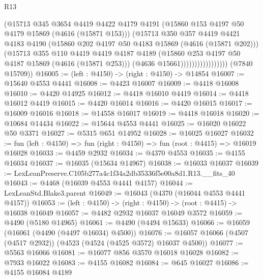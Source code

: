 \begin{lexlean}{R13}
\begin{coremodule}
                                (@15713
                                  @345
                                  @3654
                                  @4419
                                  @4422
                                  @4179
                                  @4191
                                  (@15860 @153 @4197 @50 @4179 @15869 (@4616 (@15871 @153)))
                                  (@15713
                                    @350
                                    @357
                                    @4419
                                    @4421
                                    @4183
                                    @4190
                                    (@15860 @202 @4197 @50 @4183 @15869 (@4616 (@15871 @202)))
                                    (@15713
                                      @355
                                      @110
                                      @4419
                                      @4419
                                      @4187
                                      @4189
                                      (@15860 @253 @4197 @50 @4187 @15869 (@4616 (@15871 @253)))
                                      (@4636 @15661)))))))))))))))))
      (@7840 @15709))
@16005 := (left : @4150) -> (right : @4150) -> @14854
@16007 := @15640 @4553 @4441
@16008 := @4423 @16007
@16009 := @4418 @16008
@16010 := @4420 @14925
@16012 := @4418 @16010 @4419
@16014 := @4418 @16012 @4419
@16015 := @4420 @16014
@16016 := @4420 @16015
@16017 := @16009 @16016
@16018 := @14558 @16017
@16019 := @4418 @16018
@16020 := @10684 @14434
@16022 := @15644 @4553 @4441
@16025 := @16020 @16022 @50 @3371
@16027 := @5315 @651 @14952
@16028 := @16025 @16027
@16032 := fun (left : @4150) => fun (right : @4150) => fun (root : @4415) => @16019 @16028
@16033 := @4459 @2932
@16034 := @4370 @4553
@16035 := @4155 @16034
@16037 := @16035 (@15634 @14967)
@16038 := @16033 @16037
@16039 := LexLeanPreserve.C105b277a4c1f34a2db35336f5e00a8d1.R13.__fits_40
@16043 := @4468 (@16039 @4553 @4441 @4157)
@16044 := LexLeanStd.Blake3.parent
@16049 := @16043 (@4370 (@16044 @4553 @4441 @4157))
@16053 := (left : @4150) -> (right : @4150) -> (root : @4415) -> @16038 @16049
@16057 := @4482 @2932 @16037 @16049 @3572
@16059 := @4490 (@5180 @14965)
@16061 := @4490 (@4494 @15633)
@16066 := @16059 (@16061 (@4490 (@4497 @16034) @4500))
@16076 := @16057 @16066 (@4507 (@4517 @2932)) (@4523 (@4524 (@4525 @3572) @16037 @4500))
@16077 := @5563 @16066
@16081 := @16077 @856 @3570 @16018 @16028
@16082 := @7933 @16022
@16083 := @4155 @16082
@16084 := @645 @16027
@16086 := @4155 @16084 @4189

\end{coremodule}
\end{lexlean}
